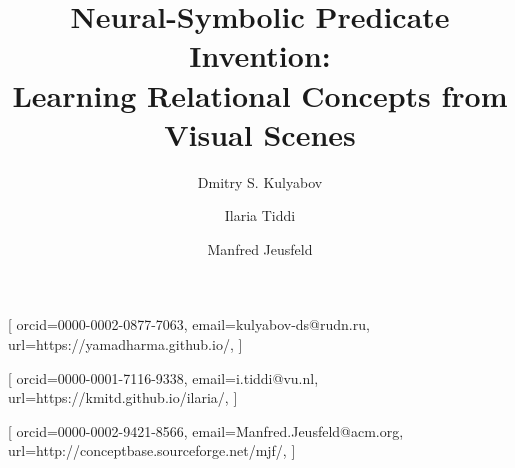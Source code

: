 \documentclass[
]{ceurart}
\begin{document}


\title{Neural-Symbolic Predicate Invention: \\Learning Relational Concepts from Visual Scenes}

\tnotemark[1]

\author[1,2]{Dmitry S. Kulyabov}[%
orcid=0000-0002-0877-7063,
email=kulyabov-ds@rudn.ru,
url=https://yamadharma.github.io/,
]
\cormark[1]
\fnmark[1]
\address[1]{Peoples' Friendship University of Russia (RUDN University),
  6 Miklukho-Maklaya St, Moscow, 117198, Russian Federation}
\address[2]{Joint Institute for Nuclear Research,
  6 Joliot-Curie, Dubna, Moscow region, 141980, Russian Federation}

\author[3]{Ilaria Tiddi}[%
orcid=0000-0001-7116-9338,
email=i.tiddi@vu.nl,
url=https://kmitd.github.io/ilaria/,
]
\fnmark[1]
\address[3]{Vrije Universiteit Amsterdam, De Boelelaan 1105, 1081 HV Amsterdam, The Netherlands}

\author[4]{Manfred Jeusfeld}[%
orcid=0000-0002-9421-8566,
email=Manfred.Jeusfeld@acm.org,
url=http://conceptbase.sourceforge.net/mjf/,
]
\fnmark[1]
\address[4]{University of Skövde, Högskolevägen 1, 541 28 Skövde, Sweden}

\end{document}
